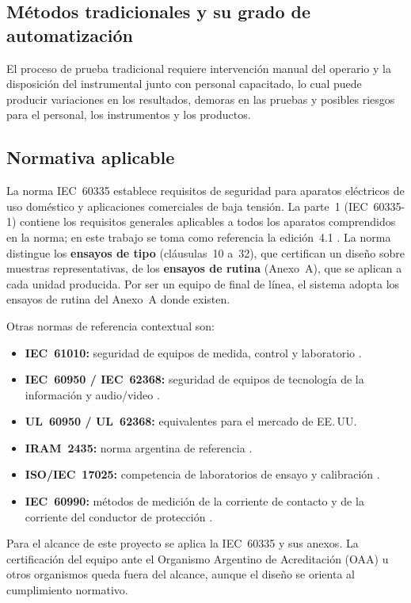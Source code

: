 \subsection{Métodos tradicionales y su grado de automatización}

El proceso de prueba tradicional requiere intervención manual del operario y la
disposición del instrumental junto con personal capacitado, lo cual puede
producir variaciones en los resultados, demoras en las pruebas y posibles riesgos
para el personal, los instrumentos y los productos.

\subsection{Normativa aplicable}
\label{subsec:normativa}

La norma IEC~60335 establece requisitos de seguridad para aparatos eléctricos de
uso doméstico y aplicaciones comerciales de baja tensión. La parte~1
(IEC~60335-1) contiene los requisitos generales aplicables a todos los aparatos
comprendidos en la norma; en este trabajo se toma como referencia la
edición~4.1 \cite{iec60335}. La norma distingue los \textbf{ensayos de tipo}
(cláusulas~10 a~32), que certifican un diseño sobre muestras representativas, de
los \textbf{ensayos de rutina} (Anexo~A), que se aplican a cada unidad producida.
Por ser un equipo de final de línea, el sistema adopta los ensayos de rutina del
Anexo~A donde existen.

Otras normas de referencia contextual son:
\begin{itemize}
    \item \textbf{IEC~61010:} seguridad de equipos de medida, control y laboratorio
          \cite{iec61010}.
    \item \textbf{IEC~60950 / IEC~62368:} seguridad de equipos de tecnología de la
          información y audio/video \cite{iec62368}.
    \item \textbf{UL~60950 / UL~62368:} equivalentes para el mercado de EE.\,UU.
    \item \textbf{IRAM~2435:} norma argentina de referencia \cite{iram2435}.
    \item \textbf{ISO/IEC~17025:} competencia de laboratorios de ensayo y
          calibración \cite{iso17025}.
    \item \textbf{IEC~60990:} métodos de medición de la corriente de contacto y de
          la corriente del conductor de protección \cite{iec60990}.
\end{itemize}

\noindent Para el alcance de este proyecto se aplica la IEC~60335 y sus anexos.
La certificación del equipo ante el Organismo Argentino de Acreditación (OAA) u
otros organismos queda fuera del alcance, aunque el diseño se orienta al
cumplimiento normativo.
